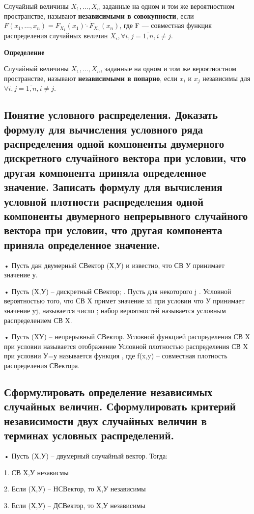 Случайный величины $X_1, \dots, X_n$ заданные на одном и том же вероятностном пространстве, называют \textbf{независимыми в совокупности}, если $F(x_1, \dots, x_n) = F_{X_1}(x_1) \dot \cdot \dot F_{X_n}(x_n)$, где F --- совместная функция распределения случайных величин $X_i, \forall i,j = \overline{1,n}, i \neq j$.

\textbf{Определение}

Случайный величины $X_1, \dots, X_n$, заданные на одном и том же вероятностном пространстве, называют \textbf{независимыми в попарно}, если $x_i$ и $x_j$ независимы  для $\forall i,j = \overline{1,n}, i \neq j$.

\subsection{Понятие условного распределения. Доказать формулу для вычисления условного ряда распределения одной компоненты двумерного дискретного случайного вектора при условии, что другая компонента приняла определенное значение. Записать формулу для вычисления условной плотности распределения одной компоненты двумерного непрерывного случайного вектора при условии, что другая компонента приняла определенное значение.}

• Пусть дан двумерный СВектор (Х,У) и известно, что СВ У принимает значение у.

• Пусть (Х,У) – дискретный СВектор; . Пусть для некоторого j . Условной вероятностью того, что СВ Х примет значение xi при условии что У принимает значение yj, называется число ; набор вероятностей  называется условным распределением СВ Х.

• Пусть (ХУ) – непрерывный СВектор. Условной функцией распределения СВ Х при условии  называется отображение  Условной плотностью распределения СВ Х при условии У=у называется функция , где f(x,y) – совместная плотность распределения СВектора.

\subsection{Сформулировать определение независимых случайных величин. Сформулировать критерий независимости двух случайных величин в терминах условных распределений.}

• Пусть (Х,У) – двумерный случайный вектор. Тогда:

1. СВ Х,У независмы 

2. Если (Х,У) – НСВектор, то Х,У независимы 

3. Если (Х,У) – ДСВектор, то Х,У независимы 

